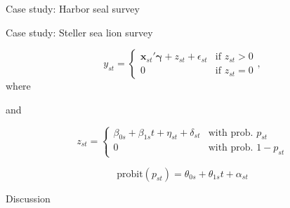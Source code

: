 \documentclass[12pt,letter]{article}
\newcommand{\bx}{\ensuremath{\mathbf{x}}}
\newcommand{\bg}{\ensuremath{\boldsymbol{\gamma}}}
\begin{document}
\centerline{\sc Case study: Harbor seal survey}

\centerline{\sc Case study: Steller sea lion survey}

\begin{equation}
y_{st} = \left\{
	\begin{array}{ll} 
	\bx_{st}'\bg + z_{st} + \epsilon_{st} & \mbox{if } z_{st}>0\\
	0 & \mbox{if } z_{st}=0
	\end{array}\right.,
\end{equation}
where 

\centerline{and}
\begin{equation}
z_{st} = \left\{
	\begin{array}{ll}
		\beta_{0s} + \beta_{1s}t + \eta_{st} + \delta_{st} & \mbox{with prob. } p_{st}\\
		0 & \mbox{with prob. } 1-p_{st}
	\end{array}\right.
\end{equation}

\begin{equation}
\mbox{probit}(p_{st}) = \theta_{0s} + \theta_{1s}t + \alpha_{st}
\end{equation}


\centerline{\sc Discussion}
\end{document}
